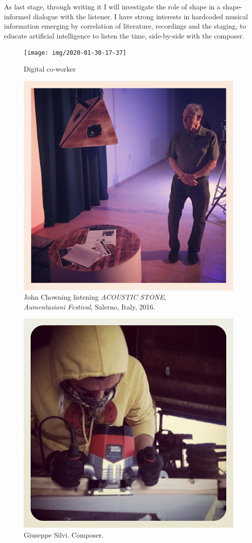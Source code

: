 \documentclass[
	a4paper,
	twocolumn
	]{article}
\begin{document}
As last stage, through writing it I will investigate the role of shape in a shape-informed dialogue with the listener. I have strong interests in hardcoded musical information emerging by correlation of literature, recordings and the staging, to educate artificial intelligence to listen the time, side-by-side with the composer.

\begin{figure}[htbp]
\begin{center}
\texttt{[image: img/2020-01-30-17-37]}
\caption{Digital co-worker}
\label{ai}
\end{center}
\end{figure}

\raggedright



\vfill\null



\begin{figure}[htbp]
\begin{center}
\includegraphics[width=.47\textwidth]{img/14597413_1128159647252783_1502048594255937536_n.jpg}
\caption{John Chowning listening \emph{ACOUSTIC STONE}, \\ \emph{Aumentazioni Festival}, Salerno, Italy, 2016.}
\label{chowning}
\end{center}
\end{figure}

\begin{figure}[htbp]
\centering
\includegraphics[width=.47\textwidth]{img/927576_1422938657945799_34474354_n}
\caption{Giuseppe Silvi. Composer.}
\label{composer}
\end{figure}
\end{document}
